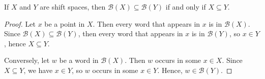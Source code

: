 \documentclass{article}
\newcommand{\Lc}{\mathcal{L}}  %
\newcommand{\Gc}{\mathcal{G}}  %
\newcommand{\Hc}{\mathcal{H}}  %
\newcommand{\Ec}{\mathcal{E}}
\newcommand{\Bc}{\mathcal{B}}
\newcommand{\shift}[1]{\mathsf{X}_{#1}}
\theoremstyle{definition}
\begin{document}
        




    \begin{lemma}
        If \(X\) and \(Y\) are shift spaces, then \(\Bc(X) \subseteq \Bc(Y)\) if and only if \(X \subseteq Y\).
    \end{lemma}

    \begin{proof}
        Let \(x\) be a point in \(X\). Then every word that appears in \(x\) is in \(\Bc(X)\). Since 
        \(\Bc(X) \subseteq \Bc(Y)\), then every word that appears in \(x\) is in \(\Bc(Y)\),
        so \(x \in Y\), hence \(X \subseteq Y\).

        Conversely, let \(w\) be a word in \(\Bc(X)\). Then \(w\) occurs in some \(x \in X\). 
        Since \(X \subseteq Y\), we have \(x \in Y\), so \(w\) occurs in some \(x \in Y\). Hence, \(w \in \Bc(Y)\).
    \end{proof}
\end{document}
